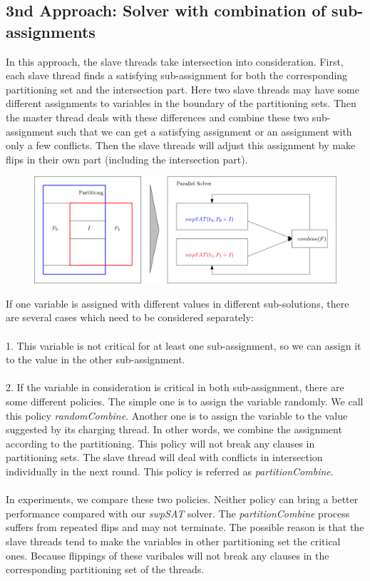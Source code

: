 \documentclass[12pt,a4paper,twoside]{scrartcl}
\numberwithin{equation}{section}
\begin{document}
\subsection{3nd Approach: Solver with combination of sub-assignments}
In this approach, the slave threads take intersection into consideration. First, each slave thread finds a satisfying sub-assignment for both the corresponding partitioning set and the intersection part. Here two slave threads may have some different assignments to variables in the boundary of the partitioning sets. Then the master thread deals with these differences and  combine these two sub-assignment such that we can get a satisfying assignment or an assignment with only a few conflicts. Then the slave threads will adjust this assignment by make flips in their own part (including the intersection part). 
\begin{figure}[H]
\begin{center}
  \includegraphics[scale = 0.3]{1/a3.png}
  \end{center}
  \label{a2}
  \end{figure}
If one variable is assigned with different values in different sub-solutions, there are several cases which need to be considered separately:\\ 
\\
1. This variable is not critical for at least one sub-assignment, so we can assign it to the value in the other sub-assignment.\\
\\
2. If the variable in consideration is critical in both sub-assignment, there are some different policies. The simple one is to assign the variable randomly. We call this policy \emph{randomCombine}. Another one is to assign the variable to the value suggested by its charging thread. In other words, we combine the assignment according to the partitioning. This policy will not break any clauses in partitioning sets. The slave thread will deal with conflicts in intersection individually in the next round. This policy is referred as \emph{partitionCombine}.\\
\\ In experiments, we compare these two policies. Neither policy can bring a better performance compared with our \emph{swpSAT} solver. The \emph{partitionCombine} process suffers from repeated flips and may not terminate. The possible reason is that the slave threads tend to make the variables in other partitioning set the critical ones. Because flippings of these varibales will not break any clauses in the corresponding partitioning set of the threads.
 
\end{document}
